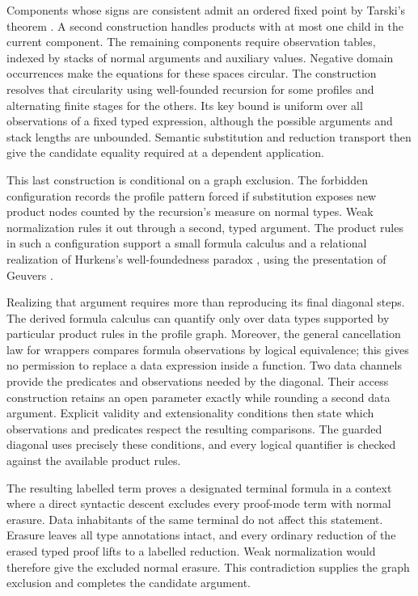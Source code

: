 Components whose signs are consistent admit an ordered fixed point by
Tarski's theorem \cite{Tarski1955}. A second construction handles products
with at most one child in the current component. The remaining components
require observation tables, indexed by stacks of normal arguments and
auxiliary values. Negative domain occurrences make the equations for
these spaces circular. The construction resolves that circularity using
well-founded recursion for some profiles and alternating finite stages
for the others. Its key bound is uniform over all observations of a fixed
typed expression, although the possible arguments and stack lengths are
unbounded. Semantic substitution and reduction transport then give the
candidate equality required at a dependent application.

This last construction is conditional on a graph exclusion. The forbidden
configuration records the profile pattern forced if substitution exposes
new product nodes counted by the recursion's measure on normal types.
Weak normalization rules it out through a second, typed argument. The
product rules in such a configuration support a small
formula calculus and a relational realization of Hurkens's
well-foundedness paradox \cite{Hurkens1995}, using the presentation of
Geuvers \cite[Section~2]{Geuvers2007}.

Realizing that argument requires more than reproducing its final diagonal
steps. The derived formula calculus can quantify only over data types
supported by particular product rules in the profile graph. Moreover, the
general cancellation law for wrappers compares formula observations by
logical equivalence; this gives
no permission to replace a data expression inside a function.
Two data channels provide the predicates and observations needed by the
diagonal. Their access construction retains an open parameter exactly
while rounding a second data argument. Explicit validity and
extensionality conditions then state which observations and predicates
respect the resulting comparisons. The guarded diagonal uses precisely
these conditions, and every logical quantifier is checked against the
available product rules.

The resulting labelled term proves a designated terminal formula in a
context where a direct syntactic descent excludes every proof-mode term
with normal erasure. Data inhabitants of the same terminal do not affect
this statement. Erasure leaves all type annotations intact, and every
ordinary reduction of the erased typed proof lifts to a labelled
reduction. Weak normalization would therefore give the excluded normal
erasure. This contradiction supplies the graph exclusion and completes
the candidate argument.

